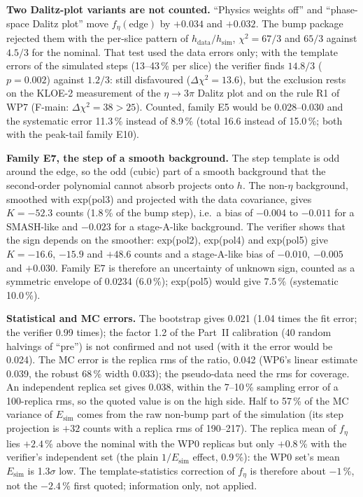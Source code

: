 \documentclass[11pt,a4paper]{article}
\begin{document}
\textbf{Two Dalitz-plot variants are not counted.} ``Physics weights off'' and ``phase-space Dalitz plot'' move $f_\eta(\mathrm{edge})$ by $+0.034$ and
$+0.032$. The bump package rejected them with the per-slice pattern of $h_{\mathrm{data}}/h_{\mathrm{sim}}$, $\chi^2=67/3$ and $65/3$ against $4.5/3$
for the nominal. That test used the data errors only; with the template errors of the simulated steps (13--43\,\% per slice) the verifier finds
$14.8/3$ ($p=0.002$) against $1.2/3$: still disfavoured ($\Delta\chi^2=13.6$), but the exclusion rests on the KLOE-2 measurement of the
$\eta\to3\pi$ Dalitz plot and on the rule R1 of WP7 (F-main: $\Delta\chi^2=38>25$). Counted, family E5 would be 0.028--0.030 and the systematic error
11.3\,\% instead of 8.9\,\% (total 16.6 instead of 15.0\,\%; both with the peak-tail family E10).

\textbf{Family E7, the step of a smooth background.} The step template is odd around the edge, so the odd (cubic) part of a smooth background that the
second-order polynomial cannot absorb projects onto $h$. The non-$\eta$ background, smoothed with exp(pol3) and projected with the data
covariance, gives $K=-52.3$ counts (1.8\,\% of the bump step), i.e.\ a bias of $-0.004$ to $-0.011$ for a SMASH-like and $-0.023$ for a
stage-A-like background. The verifier shows that the sign depends on the smoother: exp(pol2), exp(pol4) and exp(pol5) give $K=-16.6$, $-15.9$ and
$+48.6$ counts and a stage-A-like bias of $-0.010$, $-0.005$ and $+0.030$. Family E7 is therefore an uncertainty of unknown sign, counted as a symmetric
envelope of 0.0234 (6.0\,\%); exp(pol5) would give 7.5\,\% (systematic 10.0\,\%).

\textbf{Statistical and MC errors.} The bootstrap gives 0.021 (1.04 times the fit error; the verifier 0.99 times); the factor 1.2 of the Part~II
calibration (40 random halvings of ``pre'') is not confirmed and not used (with it the error would be 0.024). The MC error is the replica rms of
the ratio, 0.042 (WP6's linear estimate 0.039, the robust 68\,\% width 0.033); the pseudo-data need the rms for coverage. An independent replica
set gives 0.038, within the 7--10\,\% sampling error of a 100-replica rms, so the quoted value is on the high side. Half to 57\,\% of the MC variance
of $E_{\mathrm{sim}}$ comes from the raw non-bump part of the simulation (its step projection is $+32$ counts with a replica rms of 190--217). The
replica mean of $f_\eta$ lies $+2.4$\,\% above the nominal with the WP0 replicas but only $+0.8$\,\% with the verifier's independent set (the plain
$1/E_{\mathrm{sim}}$ effect, 0.9\,\%): the WP0 set's mean $E_{\mathrm{sim}}$ is 1.3$\sigma$ low. The template-statistics correction of $f_\eta$ is
therefore about $-1$\,\%, not the $-2.4$\,\% first quoted; information only, not applied.
\end{document}
